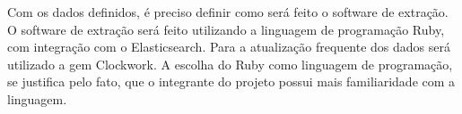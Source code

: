 Com os dados definidos, é preciso definir como será feito o software de extração. O software de extração será feito utilizando a linguagem de programação Ruby, com integração com o Elasticsearch. Para a atualização frequente dos dados será utilizado a gem Clockwork. A escolha do Ruby como linguagem de programação, se justifica pelo fato, que o integrante do projeto possui mais familiaridade com a linguagem.